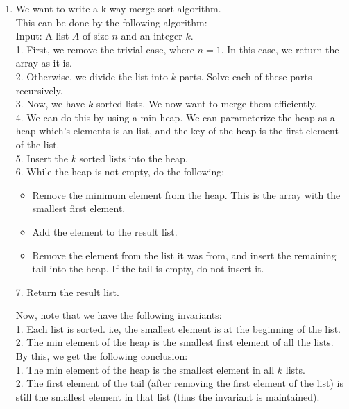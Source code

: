 \documentclass[a4paper]{article}
\begin{document}
\begin{enumerate}
    \item We want to write a k-way merge sort algorithm.\\
    This can be done by the following algorithm:\\
    
    Input: A list $A$ of size $n$ and an integer $k$.\\

    1. First, we remove the trivial case, where $n = 1$. In this case, we return the array as it is.\\
    2. Otherwise, we divide the list into $k$ parts. Solve each of these parts recursively.\\
    3. Now, we have $k$ sorted lists. We now want to merge them efficiently.\\
    4. We can do this by using a min-heap. We can parameterize the heap as a heap which's elements is an list, and the key of the heap is the first element of the list.\\
    5. Insert the $k$ sorted lists into the heap.\\
    6. While the heap is not empty, do the following:
        \begin{itemize}
            \item Remove the minimum element from the heap. This is the array with the smallest first element.
            \item Add the element to the result list.
            \item Remove the element from the list it was from, and insert the remaining tail into the heap. If the tail is empty, do not insert it.
        \end{itemize}
    7. Return the result list.


    Now, note that we have the following invariants:\\
    1. Each list is sorted. i.e, the smallest element is at the beginning of the list.\\
    2. The min element of the heap is the smallest first element of all the lists.\\

    By this, we get the following conclusion:\\
    1. The min element of the heap is the smallest element in all $k$ lists.\\
    2. The first element of the tail (after removing the first element of the list) is still the smallest element in that list (thus the invariant is maintained).\\


\end{enumerate}
\end{document}
